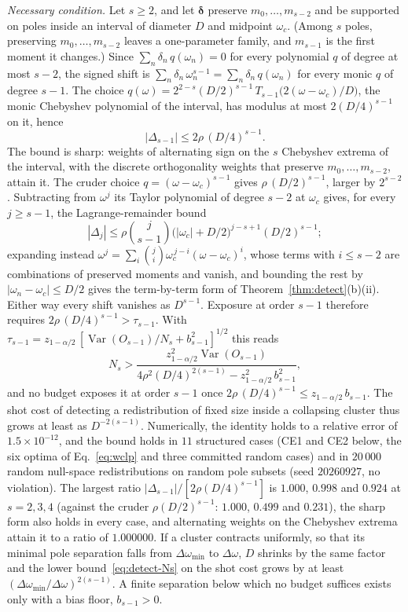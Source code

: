 \documentclass[submission, PhysCore]{SciPost}
\begin{document}
\begin{appendix}
\emph{Necessary condition.} Let $s\ge2$, and let $\bm{\delta}$ preserve $m_0,\dots,m_{s-2}$ and be supported on poles inside an interval of diameter $D$ and midpoint $\omega_c$. (Among $s$ poles, preserving $m_0,\dots,m_{s-2}$ leaves a one-parameter family, and $m_{s-1}$ is the first moment it changes.) Since $\sum_n\delta_n\,q(\omega_n)=0$ for every polynomial $q$ of degree at most $s-2$, the signed shift is $\sum_n\delta_n\,\omega_n^{s-1}=\sum_n\delta_n\,q(\omega_n)$ for every monic $q$ of degree $s-1$. The choice $q(\omega)=2^{2-s}(D/2)^{s-1}\,T_{s-1}\big(2(\omega-\omega_c)/D\big)$, the monic Chebyshev polynomial of the interval, has modulus at most $2(D/4)^{s-1}$ on it, hence
\[
|\Delta_{s-1}|\le2\rho\,(D/4)^{s-1}.
\]
The bound is sharp: weights of alternating sign on the $s$ Chebyshev extrema of the interval, with the discrete orthogonality weights that preserve $m_0,\dots,m_{s-2}$, attain it. The cruder choice $q=(\omega-\omega_c)^{s-1}$ gives $\rho\,(D/2)^{s-1}$, larger by $2^{s-2}$.
Subtracting from $\omega^j$ its Taylor polynomial of degree $s-2$ at $\omega_c$ gives, for every ${j\ge s-1}$, the Lagrange-remainder bound
\[
|\Delta_j|\le\rho\binom{j}{s-1}\big(|\omega_c|+D/2\big)^{j-s+1}(D/2)^{s-1};
\]
expanding instead $\omega^{j}=\sum_i\binom{j}{i}\omega_c^{\,j-i}(\omega-\omega_c)^i$, whose terms with ${i\le s-2}$ are combinations of preserved moments and vanish, and bounding the rest by $|\omega_n-\omega_c|\le D/2$ gives the term-by-term form of \mbox{Theorem}~\ref{thm:detect}(b)(ii). Either way every shift vanishes as $D^{s-1}$. Exposure at order $s-1$ therefore requires $2\rho\,(D/4)^{s-1}>\tau_{s-1}$. With $\tau_{s-1}=z_{1-\alpha/2}\,[\operatorname{Var}(O_{s-1})/N_s+b_{s-1}^2]^{1/2}$ this reads
\[
N_s>\frac{z_{1-\alpha/2}^{2}\operatorname{Var}(O_{s-1})}{4\rho^2(D/4)^{2(s-1)}-z_{1-\alpha/2}^2\,b_{s-1}^2},
\]
and no budget exposes it at order $s-1$ once $2\rho\,(D/4)^{s-1}\le z_{1-\alpha/2}\,b_{s-1}$. The shot cost of detecting a redistribution of fixed size inside a collapsing cluster thus grows at least as $D^{-2(s-1)}$. Numerically, the identity holds to a relative error of $1.5\times10^{-12}$, and the bound holds in $11$ structured cases (CE1 and CE2 below, the six optima of Eq.~\eqref{eq:wclp} and three committed random cases) and in $20\,000$ random null-space redistributions on random pole subsets (seed $20260927$, no violation). The largest ratio $|\Delta_{s-1}|/[2\rho(D/4)^{s-1}]$ is $1.000$, $0.998$ and $0.924$ at $s=2,3,4$ (against the cruder $\rho(D/2)^{s-1}$: $1.000$, $0.499$ and $0.231$), the sharp form also holds in every case, and alternating weights on the Chebyshev extrema attain it to a ratio of $1.000000$. If a cluster contracts uniformly, so that its minimal pole separation falls from $\Delta\omega_{\min}$ to $\Delta\omega$, $D$ shrinks by the same factor and the lower bound~\eqref{eq:detect-Ns} on the shot cost grows by at least $(\Delta\omega_{\min}/\Delta\omega)^{2(s-1)}$. A finite separation below which no budget suffices exists only with a bias floor, $b_{s-1}>0$.


\end{appendix}
\end{document}
